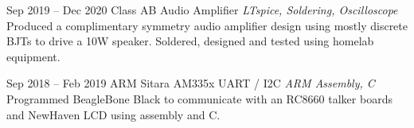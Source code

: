 \documentclass[letterpaper,11pt]{moderncv}        %
\begin{document}
\cventry
{Sep 2019 -- Dec 2020}
{Class AB Audio Amplifier}
{}
{\textit{LTspice, Soldering, Oscilloscope}}
{}
{Produced a complimentary symmetry audio amplifier design using mostly discrete BJTs to drive a 10W speaker.  Soldered, designed and tested using homelab equipment.\\}

\cventry
{Sep 2018 -- Feb 2019}
{ARM Sitara AM335x UART / I2C}
{}
{\textit{ARM Assembly, C}}
{}
{Programmed BeagleBone Black to communicate with an RC8660 talker boards and NewHaven LCD using assembly and C.\\}	




	


	
	
\end{document}
